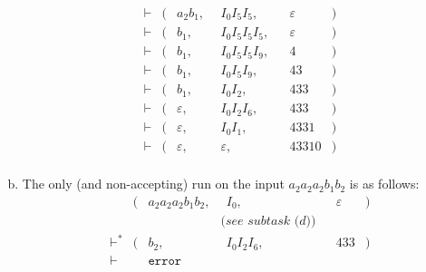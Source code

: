 \begin{solution}
\begin{enumerate}[(a)]
\begin{align*}
      \vdash &(& a_2 b_1, & ~~ I_0 I_5 I_5, &&\varepsilon &)\\
      \vdash &(& b_1, & ~~ I_0 I_5 I_5 I_5, &&\varepsilon &)\\
      \vdash &(& b_1, & ~~ I_0 I_5 I_5 I_9, &&4 &)\\
      \vdash &(& b_1, & ~~ I_0 I_5 I_9, &&43 &)\\
      \vdash &(& b_1, & ~~ I_0 I_2, &&433 &)\\
      \vdash &(& \varepsilon, & ~~ I_0 I_2 I_6, &&433 &)\\
      \vdash &(& \varepsilon, & ~~ I_0 I_1, &&4331 &)\\
      \vdash &(& \varepsilon, & ~~ \varepsilon, &&43310 &)\\
    \end{align*}
\item The only (and non-accepting) run on the input $a_2 a_2 a_2 b_1 b_2$ is as follows:
    \begin{align*}
             &(& a_2 a_2 a_2 b_1 b_2, & ~~ I_0, &&\varepsilon &)\\
             &&& \textit{(see subtask (d))} &&&\\ 
      \vdash^{*} &(& b_2, & ~~ I_0 I_2 I_6, &&433 &)\\
      \vdash && \texttt{error} &&&&\\
    \end{align*}
\end{enumerate}
\end{solution}
